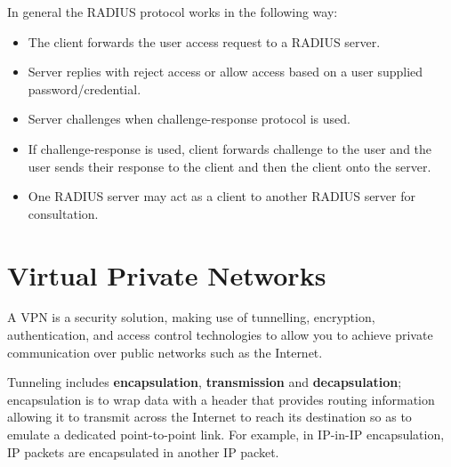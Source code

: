 \documentclass{article}
\begin{document}
In general the RADIUS protocol works in the following way:
\begin{itemize}
  \item The client forwards the user access request to a RADIUS server.
  \item Server replies with reject access or allow access based on a user supplied password/credential.
  \item Server challenges when challenge-response protocol is used.
  \item If challenge-response is used, client forwards challenge to the user and the user sends their response to the client and then the client onto the server.
  \item One RADIUS server may act as a client to another RADIUS server for consultation.
\end{itemize}

\section{Virtual Private Networks}
A VPN is a security solution, making use of tunnelling, encryption, authentication, and access control technologies to allow you to achieve private communication over public networks such as the Internet.

Tunneling includes \textbf{encapsulation}, \textbf{transmission} and \textbf{decapsulation}; encapsulation is to wrap data with a header that provides routing information allowing it to transmit across the Internet to reach its destination so as to emulate a dedicated point-to-point link. For example, in IP-in-IP encapsulation, IP packets are encapsulated in another IP packet.
\end{document}
